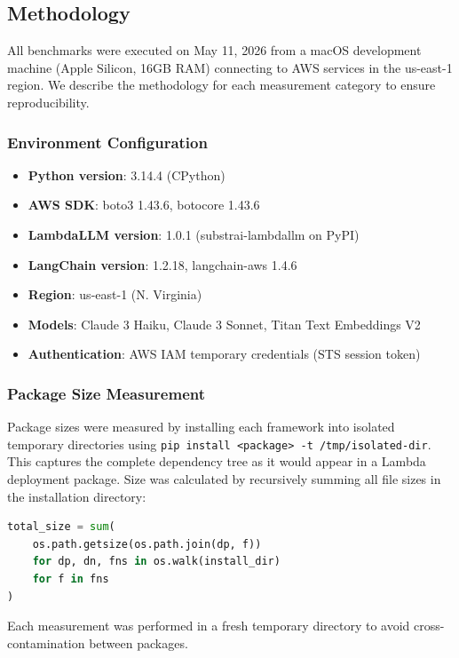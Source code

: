 \documentclass[11pt,a4paper]{article}
\begin{document}
\subsection{Methodology}

All benchmarks were executed on May 11, 2026 from a macOS development machine (Apple Silicon, 16GB RAM) connecting to AWS services in the us-east-1 region. We describe the methodology for each measurement category to ensure reproducibility.

\subsubsection{Environment Configuration}

\begin{itemize}
    \item \textbf{Python version}: 3.14.4 (CPython)
    \item \textbf{AWS SDK}: boto3 1.43.6, botocore 1.43.6
    \item \textbf{LambdaLLM version}: 1.0.1 (substrai-lambdallm on PyPI)
    \item \textbf{LangChain version}: 1.2.18, langchain-aws 1.4.6
    \item \textbf{Region}: us-east-1 (N. Virginia)
    \item \textbf{Models}: Claude 3 Haiku, Claude 3 Sonnet, Titan Text Embeddings V2
    \item \textbf{Authentication}: AWS IAM temporary credentials (STS session token)
\end{itemize}

\subsubsection{Package Size Measurement}

Package sizes were measured by installing each framework into isolated temporary directories using \texttt{pip install <package> -t /tmp/isolated-dir}. This captures the complete dependency tree as it would appear in a Lambda deployment package. Size was calculated by recursively summing all file sizes in the installation directory:

\begin{lstlisting}[language=Python]
total_size = sum(
    os.path.getsize(os.path.join(dp, f))
    for dp, dn, fns in os.walk(install_dir)
    for f in fns
)
\end{lstlisting}

Each measurement was performed in a fresh temporary directory to avoid cross-contamination between packages.
\end{document}
